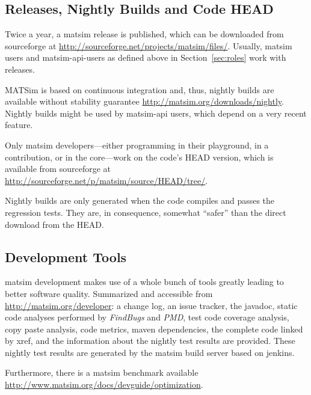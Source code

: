 \subsection{Releases, Nightly Builds and Code HEAD}
\label{sec:releases-builds}
Twice a year, a \gls{matsim} release is published, which can be downloaded from \gls{sourceforge} at \url{http://sourceforge.net/projects/matsim/files/}. Usually, \gls{matsim} users and \gls{matsim}-\gls{api}-users as defined above in Section~\ref{sec:roles} work with releases. 

MATSim is based on continuous integration and, thus, nightly builds are available without stability guarantee \url{http://matsim.org/downloads/nightly}. Nightly builds might be used by \gls{matsim}-\gls{api} users, which depend on a very recent feature. 

Only \gls{matsim} developers---either programming in their playground, in a \gls{contribution}, or in the core---work on the code's HEAD version, which is available from \gls{sourceforge} at \url{http://sourceforge.net/p/matsim/source/HEAD/tree/}.

Nightly builds are only generated when the code compiles and passes the regression tests.  They are, in consequence, somewhat ``safer'' than the direct download from the HEAD.

\subsection{Development Tools}

\gls{matsim} development makes use of a whole bunch of tools greatly leading to better software quality. Summarized and accessible from \url{http://matsim.org/developer}:
%
a change log, an issue tracker, the \gls{javadoc}, static code analyses performed by \emph{FindBugs} and \emph{PMD}, test code coverage analysis, copy paste analysis, code metrics, \gls{maven} dependencies, the complete code linked by \gls{xref}, and the information about the nightly test results are provided. These nightly test results are generated by the \gls{matsim} build server based on \gls{jenkins}. 

Furthermore, there is a \gls{matsim} benchmark available \url{http://www.matsim.org/docs/devguide/optimization}.

